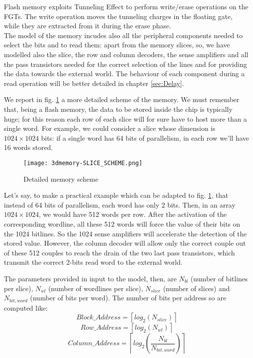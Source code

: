 Flash memory exploits Tunneling Effect to perform write/erase operations on the FGTs. The write operation moves the tunneling charges in the floating gate, while they are extracted from it during the erase phase.\\

The model of the memory incudes also all the peripheral components needed to select the bits and to read them: apart from the memory slices, so, we have modelled also the slice, the row and column decoders, the sense amplifiers and all the pass transistors needed for the correct selection of the lines and for providing the data towards the external world. The behaviour of each component during a read operation will be better detailed in chapter \ref{sec:Delay}.

We report in fig. \ref{fig:3dmemory_scheme} a more detailed scheme of the memory. We must remember that, being a flash memory, the data to be stored inside the chip is typically huge; for this reason each row of each slice will for sure have to host more than a single word. For example, we could consider a slice whose dimension is $1024\times1024$ bits: if a single word has 64 bits of parallelism, in each row we'll have 16 words stored.

\begin{center}
	\begin{figure}[H]
		\centering
		\texttt{[image: 3dmemory-SLICE\_SCHEME.png]}
		\caption{Detailed memory scheme}
		\label{fig:3dmemory_scheme}
	\end{figure}
\end{center}

Let's say, to make a practical example which can be adapted to fig. \ref{fig:3dmemory_scheme}, that instead of 64 bits of parallelism, each word has only 2 bits. Then, in an array $1024\times1024$, we would have 512 words per row. After the activation of the corresponding wordline, all these 512 words will force the value of their bits on the 1024 bitlines. So the 1024 sense amplifiers will accelerate the detection of the stored value. However, the column decoder will allow only the correct couple out of these 512 couples to reach the drain of the two last pass transistors, which transmit the correct 2-bits read word to the external world.

The parameters provided in input to the model, then, are $N_{bl}$ (number of bitlines per slice), $N_{wl}$ (number of wordlines per slice), $N_{slice}$ (number of slices) and $N_{bit,word}$ (number of bits per word). The number of bits per address so are computed like:
$$Block\_Address=\left\lceil log_2(N_{slice})\right\rceil$$
$$Row\_Address=\left\lceil log_2(N_{wl})\right\rceil$$
$$Column\_Address=\left\lceil log_2\left(\frac{N_{bl}}{N_{bit,word}}\right)\right\rceil$$



